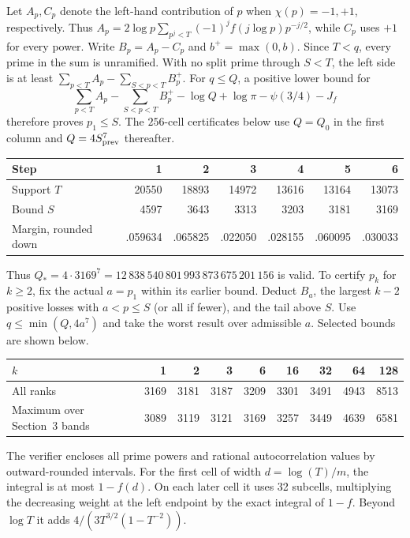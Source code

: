 \documentclass[11pt,letterpaper]{article}
\begin{document}
Let \(A_p,C_p\) denote the left-hand contribution of \(p\) when
\(\chi(p)=-1,+1\), respectively. Thus \(A_p=2\log p\sum_{p^j<T}
(-1)^j f(j\log p)p^{-j/2}\), while \(C_p\) uses \(+1\) for every power.
Write \(B_p=A_p-C_p\) and \(b^+=\max(0,b)\). Since \(T<q\), every prime
in the sum is unramified. With no split prime through \(S<T\), the left
side is at least \(\sum_{p<T}A_p-\sum_{S<p<T}B_p^+\). For \(q\le Q\), a
positive lower bound for
\[
 \sum_{p<T}A_p-\sum_{S<p<T}B_p^+-\log Q+\log\pi-\psi(3/4)-J_f
\]
therefore proves \(p_1\le S\). The \(256\)-cell certificates below use
\(Q=Q_0\) in the first column and \(Q=4S_{\rm prev}^7\) thereafter.
\begin{center}
\begin{tabular}{@{}lrrrrrr@{}}
\toprule
Step&1&2&3&4&5&6\\
\midrule
Support \(T\)&20550&18893&14972&13616&13164&13073\\
Bound \(S\)&4597&3643&3313&3203&3181&3169\\
Margin, rounded down&.059634&.065825&.022050&.028155&.060095&.030033\\
\bottomrule
\end{tabular}
\end{center}
Thus \(Q_* =4\cdot3169^7=12\,838\,540\,801\,993\,873\,675\,201\,156\) is valid.
To certify \(p_k\) for \(k\ge2\), fix the actual \(a=p_1\) within its earlier
bound. Deduct \(B_a\), the largest \(k-2\) positive losses with \(a<p\le S\)
(or all if fewer), and the tail above \(S\). Use \(q\le\min(Q,4a^7)\) and
take the worst result over admissible \(a\). Selected bounds are shown below.
\begin{center}
\begin{tabular}{@{}lrrrrrrrr@{}}
\toprule
\(k\)&1&2&3&6&16&32&64&128\\
\midrule
All ranks&3169&3181&3187&3209&3301&3491&4943&8513\\
Maximum over Section~3 bands&3089&3119&3121&3169&3257&3449&4639&6581\\
\bottomrule
\end{tabular}
\end{center}
The verifier encloses all prime powers and rational autocorrelation values
by outward-rounded intervals. For the first cell of width \(d=\log(T)/m\),
the integral is at most \(1-f(d)\). On each later cell it uses 32 subcells,
multiplying the decreasing weight at the left endpoint by the exact integral
of \(1-f\). Beyond \(\log T\) it adds \(4/(3T^{3/2}(1-T^{-2}))\).
\end{document}
